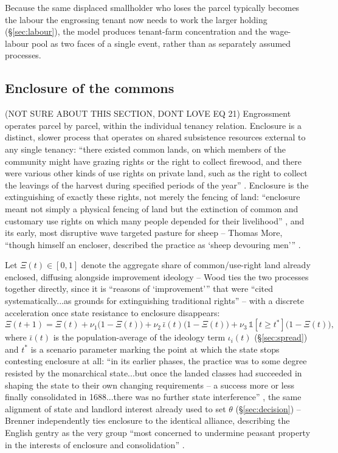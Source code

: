 \documentclass[11pt,english]{article}
\begin{document}
Because the same displaced smallholder who loses the parcel typically becomes the labour the engrossing tenant now needs to work the larger holding (\S\ref{sec:labour}), the model produces tenant-farm concentration and the wage-labour pool as two faces of a single event, rather than as separately assumed processes.

\subsection{Enclosure of the commons}
\label{sec:enclosure}
(NOT SURE ABOUT THIS SECTION, DONT LOVE EQ 21)
Engrossment operates parcel by parcel, within the individual tenancy relation. Enclosure is a distinct, slower process that operates on shared subsistence resources external to any single tenancy: ``there existed common lands, on which members of the community might have grazing rights or the right to collect firewood, and there were various other kinds of use rights on private land, such as the right to collect the leavings of the harvest during specified periods of the year'' \cite[p.107]{wood2002origin}. Enclosure is the extinguishing of exactly these rights, not merely the fencing of land: ``enclosure meant not simply a physical fencing of land but the extinction of common and customary use rights on which many people depended for their livelihood'' \cite[p.108]{wood2002origin}, and its early, most disruptive wave targeted pasture for sheep -- Thomas More, ``though himself an encloser, described the practice as `sheep devouring men''' \cite[p.108-109]{wood2002origin}.

Let $\Xi(t)\in[0,1]$ denote the aggregate share of common/use-right land already enclosed, diffusing alongside improvement ideology -- Wood ties the two processes together directly, since it is ``reasons of `improvement''' that were ``cited systematically...as grounds for extinguishing traditional rights'' \cite[p.115]{wood2002origin} -- with a discrete acceleration once state resistance to enclosure disappears:
\begin{equation}
\Xi(t+1) = \Xi(t) + \nu_1\big(1-\Xi(t)\big) + \nu_2\,\bar\iota(t)\big(1-\Xi(t)\big) + \nu_3\,\mathbb{1}[t\ge t^{*}]\big(1-\Xi(t)\big),
\end{equation}
where $\bar\iota(t)$ is the population-average of the ideology term $\iota_i(t)$ (\S\ref{sec:spread}) and $t^{*}$ is a scenario parameter marking the point at which the state stops contesting enclosure at all: ``in its earlier phases, the practice was to some degree resisted by the monarchical state...but once the landed classes had succeeded in shaping the state to their own changing requirements -- a success more or less finally consolidated in 1688...there was no further state interference'' \cite[p.109]{wood2002origin}, the same alignment of state and landlord interest already used to set $\theta$ (\S\ref{sec:decision}) -- Brenner independently ties enclosure to the identical alliance, describing the English gentry as the very group ``most concerned to undermine peasant property in the interests of enclosure and consolidation'' \cite[p.71-72]{brenner1976agrarian}.
\end{document}
